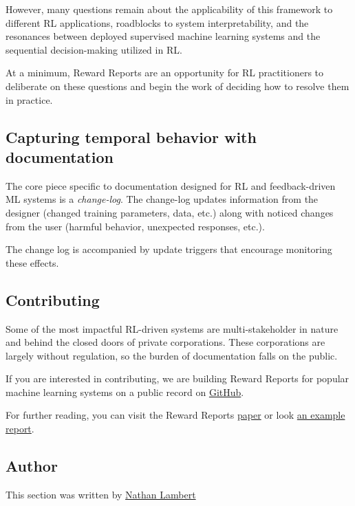 \documentclass[11pt,a4paper]{article}
\begin{document}
However, many questions remain about the applicability of this framework to different RL applications, roadblocks to system interpretability, and the resonances between deployed supervised machine learning systems and the sequential decision-making utilized in RL.

At a minimum, Reward Reports are an opportunity for RL practitioners to deliberate on these questions and begin the work of deciding how to resolve them in practice.

\subsection{Capturing temporal behavior with documentation}\label{capturing-temporal-behavior-with-documentation}

The core piece specific to documentation designed for RL and feedback-driven ML systems is a \emph{change-log}. The change-log updates information from the designer (changed training parameters, data, etc.) along with noticed changes from the user (harmful behavior, unexpected responses, etc.).

The change log is accompanied by update triggers that encourage monitoring these effects.

\subsection{Contributing}\label{contributing}

Some of the most impactful RL-driven systems are multi-stakeholder in nature and behind the closed doors of private corporations. These corporations are largely without regulation, so the burden of documentation falls on the public.

If you are interested in contributing, we are building Reward Reports for popular machine learning systems on a public record on \href{https://github.com/RewardReports/reward-reports}{GitHub}.

For further reading, you can visit the Reward Reports \href{https://arxiv.org/abs/2204.10817}{paper} or look \href{https://github.com/RewardReports/reward-reports/tree/main/examples}{an example report}.

\subsection{Author}\label{author-7}

This section was written by \href{https://twitter.com/natolambert}{Nathan Lambert}
\end{document}
